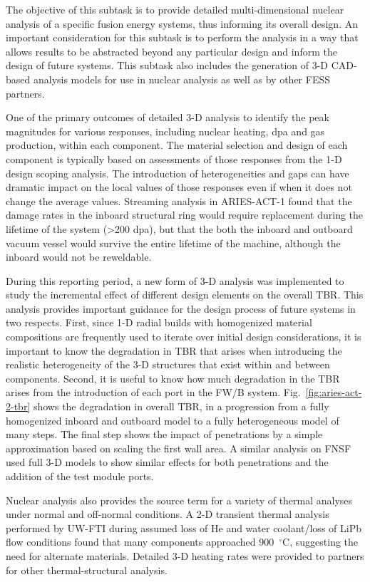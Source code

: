 The objective of this subtask is to provide detailed multi-dimensional nuclear
analysis of a specific fusion energy systems, thus informing its overall
design.  An important consideration for this subtask is to perform the
analysis in a way that allows results to be abstracted beyond any particular
design and inform the design of future systems.  This subtask also includes
the generation of 3-D CAD-based analysis models for use in nuclear analysis as
well as by other \gls{FESS} partners.

One of the primary outcomes of detailed 3-D analysis to identify the peak
magnitudes for various responses, including nuclear heating, dpa and gas
production, within each component.  The material selection and design of each
component is typically based on assessments of those responses from the 1-D
design scoping analysis.  The introduction of heterogeneities and gaps can
have dramatic impact on the local values of those responses even if when it
does not change the average values.  Streaming analysis in ARIES-ACT-1 found
that the damage rates in the inboard structural ring would require replacement
during the lifetime of the system (>200 dpa), but that the both the inboard
and outboard vacuum vessel would survive the entire lifetime of the machine,
although the inboard would not be reweldable.

During this reporting period, a new form of 3-D analysis was implemented to
study the incremental effect of different design elements on the overall
\gls{TBR}.  This analysis provides important guidance for the design process
of future systems in two respects.  First, since 1-D radial builds with
homogenized material compositions are frequently used to iterate over initial
design considerations, it is important to know the degradation in \gls{TBR}
that arises when introducing the realistic heterogeneity of the 3-D structures
that exist within and between components.  Second, it is useful to know how
much degradation in the \gls{TBR} arises from the introduction of each port in
the \gls{FW/B} system.  Fig.\ \ref{fig:aries-act-2-tbr} shows the degradation
in overall \gls{TBR}, in a progression from a fully homogenized inboard and
outboard model to a fully heterogeneous model of many steps.  The final step
shows the impact of penetrations by a simple approximation based on scaling
the first wall area.  A similar analysis on FNSF used full 3-D models to show
similar effects for both penetrations and the addition of the test module
ports.

Nuclear analysis also provides the source term for a variety of thermal
analyses under normal and off-normal conditions.  A 2-D transient thermal
analysis performed by \gls{UW-FTI} during assumed loss of He and water
coolant/loss of LiPb flow conditions found that many components approached
900\ $^\circ$C, suggesting the need for alternate materials.  Detailed 3-D
heating rates were provided to partners for other thermal-structural analysis.

